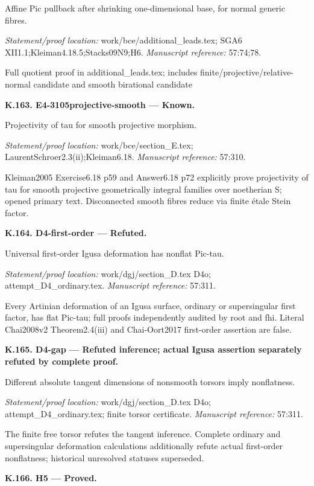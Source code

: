 Affine Pic pullback after shrinking one-dimensional base, for normal generic fibres.
\par\emph{Statement/proof location:} work/bce/additional\_leads.tex; SGA6 XII1.1;Kleiman4.18.5;Stacks09N9;H6.
\emph{Manuscript reference:} 57:74;78.
\par Full quotient proof in additional\_leads.tex; includes finite/projective/relative-normal candidate and smooth birational candidate
\par\medskip\noindent\textbf{K.163. E4-3105projective-smooth --- Known.}\par
Projectivity of tau for smooth projective morphism.
\par\emph{Statement/proof location:} work/bce/section\_E.tex; LaurentSchroer2.3(ii);Kleiman6.18.
\emph{Manuscript reference:} 57:310.
\par Kleiman2005 Exercise6.18 p59 and Answer6.18 p72 explicitly prove projectivity of tau for smooth projective geometrically integral families over noetherian S; opened primary text. Disconnected smooth fibres reduce via finite étale Stein factor.
\par\medskip\noindent\textbf{K.164. D4-first-order --- Refuted.}\par
Universal first-order Igusa deformation has nonflat Pic-tau.
\par\emph{Statement/proof location:} work/dgj/section\_D.tex D4o; attempt\_D4\_ordinary.tex.
\emph{Manuscript reference:} 57:311.
\par Every Artinian deformation of an Igusa surface, ordinary or supersingular first factor, has flat Pic-tau; full proofs independently audited by root and fhi. Literal Chai2008v2 Theorem2.4(iii) and Chai-Oort2017 first-order assertion are false.
\par\medskip\noindent\textbf{K.165. D4-gap --- Refuted inference; actual Igusa assertion separately refuted by complete proof.}\par
Different absolute tangent dimensions of nonsmooth torsors imply nonflatness.
\par\emph{Statement/proof location:} work/dgj/section\_D.tex D4o; attempt\_D4\_ordinary.tex; finite torsor certificate.
\emph{Manuscript reference:} 57:311.
\par The finite free torsor refutes the tangent inference. Complete ordinary and supersingular deformation calculations additionally refute actual first-order nonflatness; historical unresolved statuses superseded.
\par\medskip\noindent\textbf{K.166. H5 --- Proved.}\par
